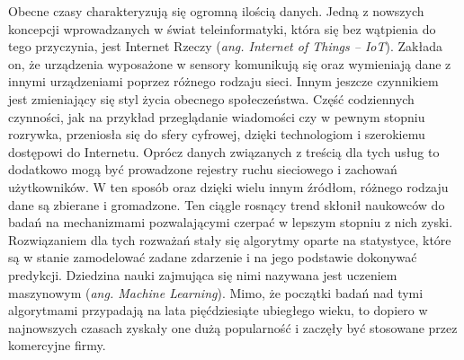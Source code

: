 
Obecne czasy charakteryzują się ogromną ilością danych. Jedną z nowszych koncepcji wprowadzanych w świat teleinformatyki, która się bez wątpienia do tego przyczynia, jest Internet Rzeczy (\textit{ang. Internet of Things --  IoT}). Zakłada on, że urządzenia wyposażone w sensory komunikują się oraz wymieniają dane z innymi urządzeniami poprzez różnego rodzaju sieci. Innym jeszcze czynnikiem jest zmieniający się styl życia obecnego społeczeństwa. Część codziennych czynności, jak na przykład przeglądanie  wiadomości czy w pewnym stopniu rozrywka, przeniosła się do sfery cyfrowej, dzięki technologiom i szerokiemu dostępowi do Internetu. Oprócz danych związanych z treścią dla tych usług to dodatkowo mogą być prowadzone rejestry ruchu sieciowego i zachowań użytkowników. W ten sposób oraz dzięki wielu innym źródłom, różnego rodzaju dane są zbierane i gromadzone. Ten ciągle rosnący trend skłonił naukowców do badań na  mechanizmami pozwalającymi czerpać w lepszym stopniu z nich zyski. Rozwiązaniem dla tych rozważań stały się algorytmy oparte na statystyce, które są w stanie zamodelować zadane zdarzenie i na jego podstawie dokonywać predykcji. Dziedzina nauki zajmująca się nimi nazywana jest uczeniem maszynowym ({\em ang. Machine Learning}). Mimo, że początki badań nad tymi algorytmami  przypadają na lata pięćdziesiąte ubiegłego wieku, to dopiero w najnowszych czasach zyskały one dużą popularność i zaczęły być stosowane przez komercyjne firmy. \par  


